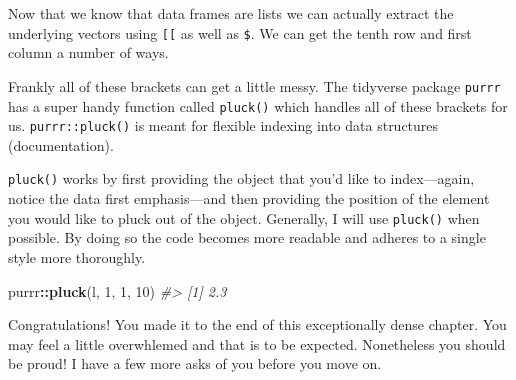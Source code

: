 \documentclass[
]{book}
\newenvironment{Shaded}{\begin{snugshade}}{\end{snugshade}}
\newcommand{\CommentTok}[1]{\textcolor[rgb]{0.56,0.35,0.01}{\textit{#1}}}
\newcommand{\DecValTok}[1]{\textcolor[rgb]{0.00,0.00,0.81}{#1}}
\newcommand{\KeywordTok}[1]{\textcolor[rgb]{0.13,0.29,0.53}{\textbf{#1}}}
\newcommand{\NormalTok}[1]{#1}
\newcommand{\OperatorTok}[1]{\textcolor[rgb]{0.81,0.36,0.00}{\textbf{#1}}}
\begin{document}
Now that we know that data frames are lists we can actually extract the underlying vectors using \texttt{{[}{[}} as well as \texttt{\$}. We can get the tenth row and first column a number of ways.

\begin{Shaded}
\end{Shaded}

Frankly all of these brackets can get a little messy. The tidyverse package \texttt{purrr} has a super handy function called \texttt{pluck()} which handles all of these brackets for us. \texttt{purrr::pluck()} is meant for flexible indexing into data structures (documentation).

\texttt{pluck()} works by first providing the object that you'd like to index---again, notice the data first emphasis---and then providing the position of the element you would like to pluck out of the object. Generally, I will use \texttt{pluck()} when possible. By doing so the code becomes more readable and adheres to a single style more thoroughly.

\begin{Shaded}
\begin{Highlighting}[]
\NormalTok{purrr}\OperatorTok{::}\KeywordTok{pluck}\NormalTok{(l, }\DecValTok{1}\NormalTok{, }\DecValTok{1}\NormalTok{, }\DecValTok{10}\NormalTok{)}
\CommentTok{\#\textgreater{} [1] 2.3}
\end{Highlighting}
\end{Shaded}

Congratulations! You made it to the end of this exceptionally dense chapter. You may feel a little overwhlemed and that is to be expected. Nonetheless you should be proud! I have a few more asks of you before you move on.
\end{document}
